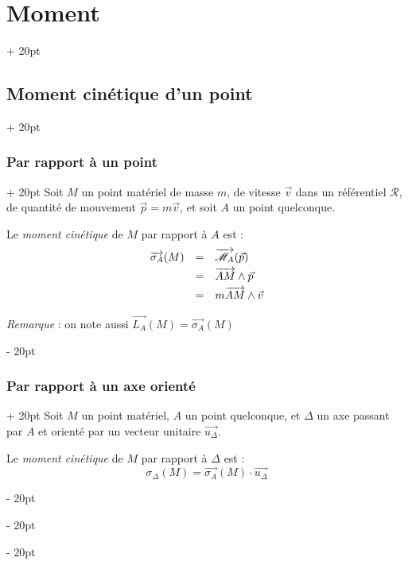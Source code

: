 \documentclass[a4paper, 12pt, twoside]{article}
\newcommand{\vect}{\overrightarrow}
\newcommand{\lr}[1]{\left( #1 \right)}
\newcommand{\ind}[1][20pt]{\advance\leftskip + #1}
\newcommand{\deind}[1][20pt]{\advance\leftskip - #1}
\newenvironment{indt}[2][20pt]{#2 \par \ind[#1]}{\par \deind} %
\begin{document}
\begin{indt}{\section{Moment}}
        \begin{indt}{\subsection{Moment cinétique d'un point}}
            \begin{indt}{\subsubsection{Par rapport à un point}}
                Soit $M$ un point matériel de masse $m$, de vitesse $\vec v$ dans un référentiel $\mathscr R$, de quantité de mouvement $\vec p = m\vec v$, et soit $A$ un point quelconque.

                \vspace{6pt}
                
                Le \textit{moment cinétique} de $M$ par rapport à $A$ est :
                \[
                    \begin{array}{rcl}
                        \vect{\sigma_A}(M)
                        &=& \vect{\mathscr M_A}\!\lr{\vec p}
                        \vspace{3pt}
                        \\
                        &=& \vect{AM} \wedge \vec p
                        \vspace{3pt}
                        \\
                        &=& m \vect{AM} \wedge \vec v
                    \end{array}
                \]

                \textit{Remarque} : on note aussi $\vect{L_A}(M) = \vect{\sigma_A}(M)$
            \end{indt}

            \vspace{12pt}
            
            \begin{indt}{\subsubsection{Par rapport à un axe orienté}}
                Soit $M$ un point matériel, $A$ un point quelconque, et $\Delta$ un axe passant par $A$ et orienté par un vecteur unitaire $\vect{u_\Delta}$.

                \vspace{6pt}
                
                Le \textit{moment cinétique} de $M$ par rapport à $\Delta$ est :
                \[
                    \sigma_\Delta(M) = \vect{\sigma_A}(M) \cdot \vect{u_\Delta}
                \]
            \end{indt}
        \end{indt}


\end{indt}
\end{document}
